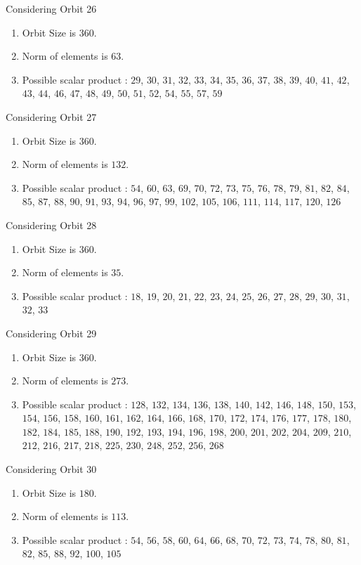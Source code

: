 \documentclass[12pt]{article}
\begin{document}
Considering Orbit 26
\begin{enumerate}
\item Orbit Size is $360$.
\item Norm of elements is $63$.
\item Possible scalar product : $29$, $30$, $31$, $32$, $33$, $34$, $35$, $36$, $37$, $38$, $39$, $40$, $41$, $42$, $43$, $44$, $46$, $47$, $48$, $49$, $50$, $51$, $52$, $54$, $55$, $57$, $59$
\end{enumerate}
Considering Orbit 27
\begin{enumerate}
\item Orbit Size is $360$.
\item Norm of elements is $132$.
\item Possible scalar product : $54$, $60$, $63$, $69$, $70$, $72$, $73$, $75$, $76$, $78$, $79$, $81$, $82$, $84$, $85$, $87$, $88$, $90$, $91$, $93$, $94$, $96$, $97$, $99$, $102$, $105$, $106$, $111$, $114$, $117$, $120$, $126$
\end{enumerate}
Considering Orbit 28
\begin{enumerate}
\item Orbit Size is $360$.
\item Norm of elements is $35$.
\item Possible scalar product : $18$, $19$, $20$, $21$, $22$, $23$, $24$, $25$, $26$, $27$, $28$, $29$, $30$, $31$, $32$, $33$
\end{enumerate}
Considering Orbit 29
\begin{enumerate}
\item Orbit Size is $360$.
\item Norm of elements is $273$.
\item Possible scalar product : $128$, $132$, $134$, $136$, $138$, $140$, $142$, $146$, $148$, $150$, $153$, $154$, $156$, $158$, $160$, $161$, $162$, $164$, $166$, $168$, $170$, $172$, $174$, $176$, $177$, $178$, $180$, $182$, $184$, $185$, $188$, $190$, $192$, $193$, $194$, $196$, $198$, $200$, $201$, $202$, $204$, $209$, $210$, $212$, $216$, $217$, $218$, $225$, $230$, $248$, $252$, $256$, $268$
\end{enumerate}
Considering Orbit 30
\begin{enumerate}
\item Orbit Size is $180$.
\item Norm of elements is $113$.
\item Possible scalar product : $54$, $56$, $58$, $60$, $64$, $66$, $68$, $70$, $72$, $73$, $74$, $78$, $80$, $81$, $82$, $85$, $88$, $92$, $100$, $105$
\end{enumerate}
\end{document}
